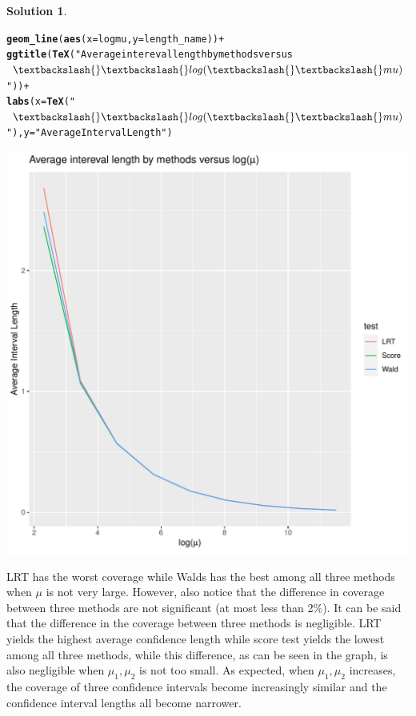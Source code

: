\documentclass[11pt,letterpaper,english,oneside]{article}\usepackage[]{graphicx}\usepackage[]{color}
\makeatletter
\def\maxwidth{ %
  \ifdim\Gin@nat@width>\linewidth
    \linewidth
  \else
    \Gin@nat@width
  \fi
}
\newcommand{\hlstr}[1]{\textcolor[rgb]{0.192,0.494,0.8}{#1}}%
\newcommand{\hlopt}[1]{\textcolor[rgb]{0,0,0}{#1}}%
\newcommand{\hlstd}[1]{\textcolor[rgb]{0.345,0.345,0.345}{#1}}%
\newcommand{\hlkwc}[1]{\textcolor[rgb]{0.333,0.667,0.333}{#1}}%
\newcommand{\hlkwd}[1]{\textcolor[rgb]{0.737,0.353,0.396}{\textbf{#1}}}%
\newenvironment{kframe}{%
 \def\at@end@of@kframe{}%
 \ifinner\ifhmode%
  \def\at@end@of@kframe{\end{minipage}}%
  \begin{minipage}{\columnwidth}%
 \fi\fi%
 \def\FrameCommand##1{\hskip\@totalleftmargin \hskip-\fboxsep
 \colorbox{shadecolor}{##1}\hskip-\fboxsep
     \hskip-\linewidth \hskip-\@totalleftmargin \hskip\columnwidth}%
 \MakeFramed {\advance\hsize-\width
   \@totalleftmargin\z@ \linewidth\hsize
   \@setminipage}}%
 {\par\unskip\endMakeFramed%
 \at@end@of@kframe}
\newenvironment{knitrout}{}{} %
\theoremstyle{definition} %
\newtheorem{solution}{Solution}
\newenvironment{sol}{\begin{solution}\hspace{0pt}}{\end{solution}}
\makeatother
\begin{document}
\begin{sol}
\begin{enumerate}
\begin{knitrout}
\begin{kframe}
\begin{alltt}
  \hlkwd{geom_line}\hlstd{(}\hlkwd{aes}\hlstd{(}\hlkwc{x}\hlstd{=logmu,} \hlkwc{y}\hlstd{=length_name))}\hlopt{+}
  \hlkwd{ggtitle}\hlstd{(}\hlkwd{TeX}\hlstd{(}\hlstr{"Average intereval length by methods versus $\textbackslash{}\textbackslash{}log(\textbackslash{}\textbackslash{}mu)$"}\hlstd{))}\hlopt{+}
  \hlkwd{labs}\hlstd{(}\hlkwc{x}\hlstd{=}\hlkwd{TeX}\hlstd{(}\hlstr{"$\textbackslash{}\textbackslash{}log(\textbackslash{}\textbackslash{}mu)$"}\hlstd{),} \hlkwc{y}\hlstd{=}\hlstr{"Average Interval Length"}\hlstd{)}
\end{alltt}
\end{kframe}
\includegraphics[width=\maxwidth]{unnamed-chunk-6-2} 
\end{knitrout}

LRT has the worst coverage while Walds has the best among all three methods when $\mu$ is not very large. However, also notice that the difference in coverage between three methods are not significant (at most less than 2\%). It can be said that the difference in the coverage between three methods is negligible. LRT yields the highest average confidence length while score test yields the lowest among all three methods, while this difference, as can be seen in the graph, is also negligible when $\mu_1,\mu_2$ is not too small. As expected, when $\mu_1,\mu_2$ increases, the coverage of three confidence intervals become increasingly similar and the confidence interval lengths all become narrower.


\end{enumerate}
\end{sol}
\end{document}
